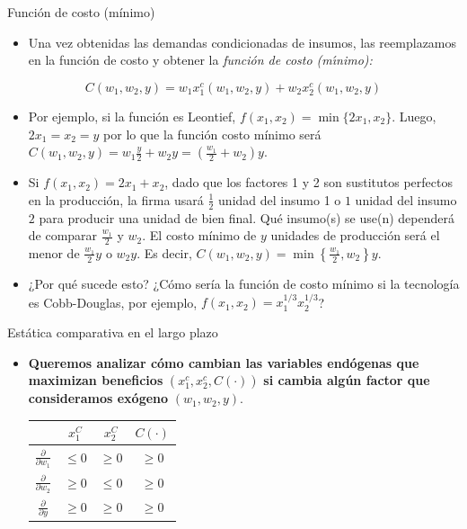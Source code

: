 \documentclass{beamer}
\theoremstyle{definition}
\begin{document}
\begin{frame}{Funci\'on de costo (m\'inimo)}\small
\begin{itemize}
\item Una vez obtenidas las demandas condicionadas de insumos, las reemplazamos
en la funci\'{o}n de costo y obtener  la \textit{funci\'on de costo (m\'{\i}nimo):}
\end{itemize}
\begin{equation*}
C(w_{1},w_{2},y)=w_{1}x^{c}_{1}(w_{1},w_{2},y)+w_{2}x^{c}_{2}(w_{1},w_{2},y)
\end{equation*}
\begin{itemize}
\item Por ejemplo, si la funci\'on es Leontief, $f(x_1,x_2)=\min\big\{2x_1,x_2\big\}$. Luego, $2x_1=x_2=y$ por lo que la funci\'on costo m\'inimo ser\'a $C(w_{1},w_{2},y)=w_1\frac{y}{2}+w_2y=\left(\frac{w_1}{2}+w_2\right)y$.
\item Si $f(x_1,x_2)=2x_1+x_2$, dado que los factores 1 y 2 son sustitutos perfectos en la producción, la firma usará $\frac{1}{2}$ unidad del insumo 1 o $1$ unidad del insumo $2$ para producir una unidad de bien final. Qué insumo(s) se use(n) dependerá de comparar $\frac{w_1}{2}$ y $w_2$. El costo mínimo de $y$ unidades de producción será el menor de $\frac{w_1}{2}y$ o $w_2y$. Es decir, $C(w_{1},w_{2},y)= \min\left\{\frac{w_1}{2},w_2\right\}y$.
\item ¿Por qué sucede esto? ¿Cómo sería la función de costo mínimo si la tecnología es Cobb-Douglas, por ejemplo, $f(x_1,x_2)=x_1^{1/3}x_2^{1/3}$?
\end{itemize}
\end{frame}

\begin{frame}{Est\'atica comparativa en el largo plazo}
	\begin{itemize}
	\item \textbf{Queremos analizar c\'{o}mo cambian las variables endógenas que maximizan beneficios} $(x_1^c,x_2^c,C(\cdot))$ \textbf{si cambia alg\'{u}n factor que consideramos ex\'{o}geno} $(w_1,w_2, y)$. 
	
\begin{center}
\begin{tabular}{|c|c|c|c|}
\hline
&$x_1^C$ & $x_2^C$&  $C(\cdot)$\\[6pt] 
\hline 
$\frac{\partial}{\partial w_1}$ & \color{cyan} $\leq 0$ & \color{rosee} $\geq 0 $&\color{rosee}$\geq 0$\\[6pt]
\hline
$\frac{\partial}{\partial w_2}$ &\color{rosee} $\geq 0$& \color{cyan} $\leq 0$&\color{rosee} $\geq 0$\\[6pt]
\hline
$\frac{\partial}{\partial y}$ &\color{rosee}$\geq 0$&\color{rosee}$\geq 0$&\color{rosee}$\geq 0$\\[6pt]
\hline
\end{tabular}
\end{center}

  \end{itemize}

  
\end{frame}	
\end{document}
